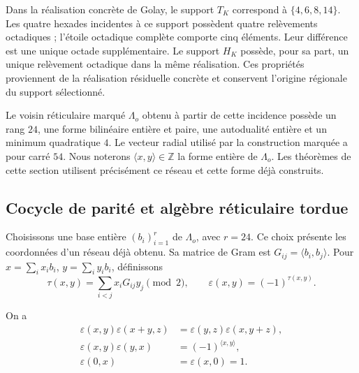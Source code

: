 Dans la réalisation concrète de Golay, le support \(T_K\) correspond à \(\{4,6,8,14\}\). Les quatre hexades incidentes à ce support possèdent quatre relèvements octadiques ; l’étoile octadique complète comporte cinq éléments. Leur différence est une unique octade supplémentaire. Le support \(H_K\) possède, pour sa part, un unique relèvement octadique dans la même réalisation. Ces propriétés proviennent de la réalisation résiduelle concrète et conservent l’origine régionale du support sélectionné.

Le voisin réticulaire marqué \(\Lambda_o\) obtenu à partir de cette incidence possède un rang \(24\), une forme bilinéaire entière et paire, une autodualité entière et un minimum quadratique \(4\). Le vecteur radial utilisé par la construction marquée a pour carré \(54\). Nous noterons \(\langle x,y\rangle\in\mathbb Z\) la forme entière de \(\Lambda_o\). Les théorèmes de cette section utilisent précisément ce réseau et cette forme déjà construits.

\subsection{Cocycle de parité et algèbre réticulaire tordue}
\label{subsec:df-cociclo}


Choisissons une base entière \((b_i)_{i=1}^{r}\) de \(\Lambda_o\), avec \(r=24\). Ce choix présente les coordonnées d’un réseau déjà obtenu. Sa matrice de Gram est \(G_{ij}=\langle b_i,b_j\rangle\). Pour \(x=\sum_i x_i b_i\), \(y=\sum_i y_i b_i\), définissons
\begin{equation}
 \tau(x,y)=\sum_{i<j}x_iG_{ij}y_j\pmod2,
 \qquad \varepsilon(x,y)=(-1)^{\tau(x,y)}.
 \label{eq:df-cociclo}
\end{equation}

\begin{proposition}
\label{prop:df-cociclo}
On a
\begin{align}
 \varepsilon(x,y)\varepsilon(x+y,z)
 &=\varepsilon(y,z)\varepsilon(x,y+z),\label{eq:df-identidad-cociclica}\\
 \varepsilon(x,y)\varepsilon(y,x)
 &=(-1)^{\langle x,y\rangle},\label{eq:df-conmutador-cociclo}\\
 \varepsilon(0,x)&=\varepsilon(x,0)=1.
\end{align}
\end{proposition}

